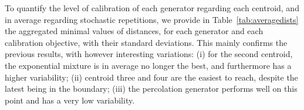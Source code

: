 \documentclass[letterpaper]{article}
\begin{document}

\begin{table}[h]
\vskip 0.25cm
\caption{Aggregated distance in the morphological space, for each generator and each calibration objective (real clusters centroids). Euclidian distance in the projected space are aggregated in average on stochastic repetitions, and the minimal average value is reported with its standard deviation.\label{tab:averagedists}}
\end{table}


To quantify the level of calibration of each generator regarding each centroid, and in average regarding stochastic repetitions, we provide in Table~\ref{tab:averagedists} the aggregated minimal values of distances, for each generator and each calibration objective, with their standard deviations. This mainly confirms the previous results, with however interesting variations: (i) for the second centroid, the exponential mixture is in average no longer the best, and furthermore has a higher variability; (ii) centroid three and four are the easiest to reach, despite the latest being in the boundary; (iii) the percolation generator performs well on this point and has a very low variability.
\end{document}

